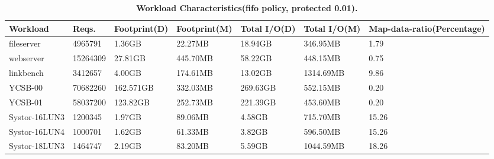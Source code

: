 \begin{table}[tb]
    \centering
    \fontsize{11}{11}
    \small
    \begin{tabular}{|l|l|l|l|l|l|l|}
		\hline
		\bf{Workload} & \bf{Reqs.} & \bf{Footprint(D)} & \bf{Footprint(M)} & \bf{Total I/O(D)} &\bf{Total I/O(M)} &\bf{Map-data-ratio(Percentage)} \\ \hline \hline
		fileserver & 4965791 & 1.36GB & 22.27MB & 18.94GB & 346.95MB & 1.79\\ \hline 		
		webserver & 15264309 & 27.81GB & 445.70MB & 58.22GB & 448.15MB & 0.75 \\ \hline 		
		linkbench & 3412657 & 4.00GB & 174.61MB & 13.02GB & 1314.69MB & 9.86 \\ \hline 		
		YCSB-00 & 70682260 & 162.571GB & 332.03MB & 269.63GB & 552.15MB & 0.20 \\ \hline 		
		YCSB-01 & 58037200 & 123.82GB & 252.73MB & 221.39GB & 453.60MB & 0.20 \\ \hline 		
		Systor-16LUN3 & 1200345 & 1.97GB & 89.06MB & 4.58GB & 715.70MB & 15.26 \\ \hline 		
		Systor-16LUN4 & 1000701 & 1.62GB & 61.33MB & 3.82GB & 596.50MB & 15.26 \\ \hline 		
		Systor-18LUN3 & 1464747 & 2.19GB & 83.20MB & 5.59GB & 1044.59MB & 18.26 \\ \hline 		
    \end{tabular}
    \caption{\textbf{Workload Characteristics(fifo policy, protected 0.01).}}
    \label{tab:wk_char}
\end{table}

